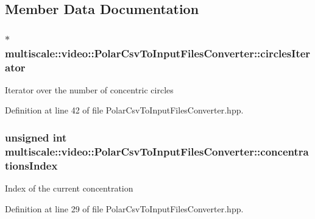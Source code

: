 \subsection{\-Member \-Data \-Documentation}
\hypertarget{classmultiscale_1_1video_1_1PolarCsvToInputFilesConverter_ad4cf12c7f3951f0bb388939797cbcc0c}{
\subsubsection[{circles\-Iterator}]{$\ast$ {\bf multiscale\-::video\-::\-Polar\-Csv\-To\-Input\-Files\-Converter\-::circles\-Iterator}}}\label{classmultiscale_1_1video_1_1PolarCsvToInputFilesConverter_ad4cf12c7f3951f0bb388939797cbcc0c}
\-Iterator over the number of concentric circles 

\-Definition at line 42 of file \-Polar\-Csv\-To\-Input\-Files\-Converter.\-hpp.

\hypertarget{classmultiscale_1_1video_1_1PolarCsvToInputFilesConverter_afd9f17e6ba2dc46b920ab28538278362}{
\subsubsection[{concentrations\-Index}]{\setlength{\rightskip}{0pt plus 5cm}unsigned int {\bf multiscale\-::video\-::\-Polar\-Csv\-To\-Input\-Files\-Converter\-::concentrations\-Index}}}\label{classmultiscale_1_1video_1_1PolarCsvToInputFilesConverter_afd9f17e6ba2dc46b920ab28538278362}
\-Index of the current concentration 

\-Definition at line 29 of file \-Polar\-Csv\-To\-Input\-Files\-Converter.\-hpp.

